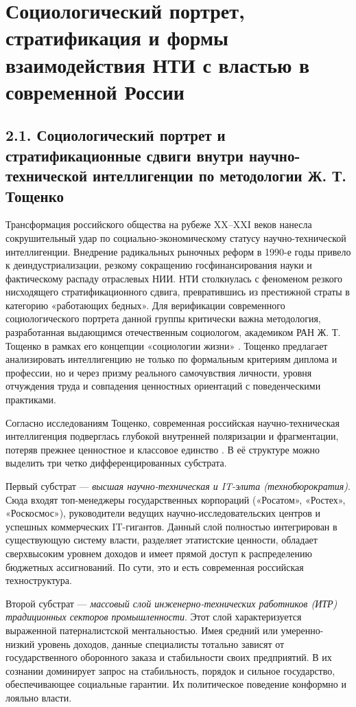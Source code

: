 \section{Социологический портрет, стратификация и формы взаимодействия НТИ с властью в современной России}

\subsection{2.1. Социологический портрет и стратификационные сдвиги внутри научно-технической интеллигенции по методологии Ж. Т. Тощенко}

Трансформация российского общества на рубеже XX–XXI веков нанесла сокрушительный удар по социально-экономическому статусу научно-технической интеллигенции. Внедрение радикальных рыночных реформ в 1990-е годы привело к деиндустриализации, резкому сокращению госфинансирования науки и фактическому распаду отраслевых НИИ. НТИ столкнулась с феноменом резкого нисходящего стратификационного сдвига, превратившись из престижной страты в категорию «работающих бедных». Для верификации современного социологического портрета данной группы критически важна методология, разработанная выдающимся отечественным социологом, академиком РАН Ж. Т. Тощенко в рамках его концепции «социологии жизни» \cite{Toschenko}. Тощенко предлагает анализировать интеллигенцию не только по формальным критериям диплома и профессии, но и через призму реального самочувствия личности, уровня отчуждения труда и совпадения ценностных ориентаций с поведенческими практиками.

Согласно исследованиям Тощенко, современная российская научно-техническая интеллигенция подверглась глубокой внутренней поляризации и фрагментации, потеряв прежнее ценностное и классовое единство \cite{Toschenko}. В её структуре можно выделить три четко дифференцированных субстрата. 

Первый субстрат --- \textit{высшая научно-техническая и IT-элита (технобюрократия)}. Сюда входят топ-менеджеры государственных корпораций («Росатом», «Ростех», «Роскосмос»), руководители ведущих научно-исследовательских центров и успешных коммерческих IT-гигантов. Данный слой полностью интегрирован в существующую систему власти, разделяет этатистские ценности, обладает сверхвысоким уровнем доходов и имеет прямой доступ к распределению бюджетных ассигнований. По сути, это и есть современная российская техноструктура.

Второй субстрат --- \textit{массовый слой инженерно-технических работников (ИТР) традиционных секторов промышленности}. Этот слой характеризуется выраженной патерналистской ментальностью. Имея средний или умеренно-низкий уровень доходов, данные специалисты тотально зависят от государственного оборонного заказа и стабильности своих предприятий. В их сознании доминирует запрос на стабильность, порядок и сильное государство, обеспечивающее социальные гарантии. Их политическое поведение конформно и лояльно власти.

